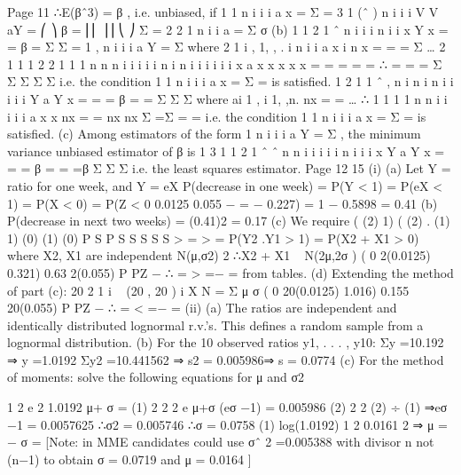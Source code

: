 \documentclass[a4paper,12pt]{article}
\begin{document}
Page 11
∴E(βˆ3) = β , i.e. unbiased, if
1
1
n
i i
i
a x
=
Σ =
3
1
(ˆ )
n
i i
i
V V aY
=
⎛ ⎞
β = ⎜⎜ ⎟⎟
⎝ ⎠
Σ = 2 2
1
n
i
i
a
=
Σ σ
(b) 1
1
2
1
ˆ
n
i i
i
n
i
i
x Y
x
=
=
β =
Σ
Σ
=
1
,
n
i i
i
a Y
= Σ
where
2
1
i , 1, , .
i n
i
i
a x i n
x
=
= =
Σ
…
2
1
1 1 2 2
1 1
1
n
n n i
i i
i i n i n
i i
i i
i i
x
a x x x
x x
=
= =
= =
∴ = = =
Σ
Σ Σ
Σ Σ
i.e. the condition 1 1 n
i i i a x = Σ = is satisfied.
1
2
1
1
ˆ ,
n
i n
i
n i i
i
i
i
Y
a Y
x
=
=
=
β = =
Σ
Σ
Σ
where ai 1 , i 1, ,n.
nx
= = …
∴
1 1
1 1
n n
i i i
i i
a x x nx
= = nx nx
Σ =Σ = =
i.e. the condition 1 1 n
i i i a x = Σ = is satisfied.
(c) Among estimators of the form 1
n
i i i a Y = Σ , the minimum variance
unbiased estimator of β is
1
3 1
1 2
1
ˆ ˆ
n
n i i
i
i i n
i
i
i
x Y
a Y
x
=
=
=
β = = =β
Σ
Σ
Σ
i.e. the least squares estimator.
Page 12
15 (i) (a) Let Y = ratio for one week, and Y = eX
P(decrease in one week) = P(Y < 1)
= P(eX < 1) = P(X < 0)
= P(Z < 0 0.0125
0.055
−
= − 0.227) = 1 − 0.5898 = 0.41
(b) P(decrease in next two weeks) = (0.41)2 = 0.17
(c) We require ( (2) 1) ( (2) . (1) 1)
(0) (1) (0)
P S P S S
S S S
> = >
= P(Y2 .Y1 > 1) = P(X2 + X1 > 0)
where X2, X1 are independent N(μ,σ2)
2
∴X2 + X1 ~ N(2μ,2σ )
( 0 2(0.0125) 0.321) 0.63
2(0.055)
P PZ −
∴ = > =− = from tables.
(d) Extending the method of part (c):
20
2
1
i ~ (20 , 20 )
i
X N
=
Σ μ σ
( 0 20(0.0125) 1.016) 0.155
20(0.055)
P PZ −
∴ = < =− =
(ii) (a) The ratios are independent and identically distributed lognormal r.v.’s.
This defines a random sample from a lognormal distribution.
(b) For the 10 observed ratios y1, . . . , y10:
Σy =10.192 ⇒ y =1.0192
Σy2 =10.441562 ⇒ s2 = 0.005986⇒ s = 0.0774
(c) For the method of moments:
solve the following equations for μ and σ2

1 2
e 2 1.0192
μ+ σ
= (1)
2 2 2 e μ+σ (eσ −1) = 0.005986 (2)
2 2 (2) ÷ (1) ⇒eσ −1 = 0.0057625
∴σ2 = 0.005746 ∴σ = 0.0758
(1) log(1.0192) 1 2 0.0161
2
⇒ μ = − σ =
[Note: in MME candidates could use σˆ 2 =0.005388 with divisor n not
(n−1) to obtain σ = 0.0719 and μ = 0.0164 ]
\end{document}
